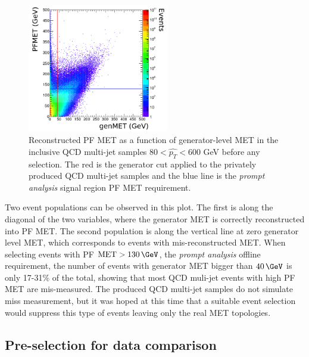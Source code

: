 \begin{figure}[!htb]
\centering
\includegraphics[width=0.55\textwidth]{Chapter05/ParkedDataPreparation/Images/Joao_140209_p11.png}
\caption[Reconstructed PF MET as a function of generator-level MET in the inclusive QCD multi-jet samples $80 < \hat{p_T} < 600$ GeV before any selection.]
{Reconstructed \gls{PF} \gls{MET} as a function of generator-level \gls{MET} in the inclusive \gls{QCD} multi-jet samples $80 < \hat{p_T} < 600$ GeV before any selection. The red is the generator cut applied to the privately produced \gls{QCD} multi-jet samples and the blue line is the \textit{prompt analysis} signal region \gls{PF} \gls{MET} requirement.}
\label{FIGURE:PreparationParkedDataAnalysis_QCDVBFMET_RecovsGenMET}
\end{figure}

Two event populations can be observed in this plot. The first is along the diagonal of the two variables, where the generator \gls{MET} is correctly reconstructed into \gls{PF} \gls{MET}. The second population is along the vertical line at zero generator level \gls{MET}, which corresponds to events with mis-reconstructed \gls{MET}. When selecting events with \gls{PF} $\text{MET}>130\,\GeV$, the \textit{prompt analysis} offline requirement, the number of events with generator \gls{MET} bigger than $40\,\GeV$ is only 17-31\% of the total, showing that most \gls{QCD} muli-jet events with high \gls{PF} \gls{MET} are mis-measured. The produced \gls{QCD} multi-jet samples do not simulate miss measurement, but it was hoped at this time that a suitable event selection would suppress this type of events leaving only the real \gls{MET} topologies.

\subsection{Pre-selection for data comparison}
\label{SECTION:PreparationParkedDataAnalysis_QCDVBFMETPreselection}

